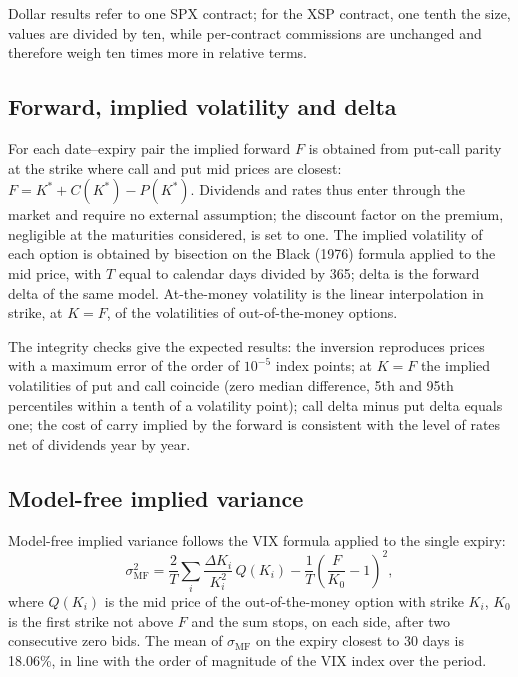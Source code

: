 \documentclass[11pt,a4paper]{article}
\begin{document}
Dollar results refer to one SPX contract; for the XSP contract, one tenth the size, values are divided by ten, while per-contract commissions are unchanged and therefore weigh ten times more in relative terms.

\subsection{Forward, implied volatility and delta}

For each date--expiry pair the implied forward $F$ is obtained from put-call parity at the strike where call and put mid prices are closest: $F = K^\ast + C(K^\ast) - P(K^\ast)$. Dividends and rates thus enter through the market and require no external assumption; the discount factor on the premium, negligible at the maturities considered, is set to one. The implied volatility of each option is obtained by bisection on the Black (1976) formula applied to the mid price, with $T$ equal to calendar days divided by 365; delta is the forward delta of the same model. At-the-money volatility is the linear interpolation in strike, at $K=F$, of the volatilities of out-of-the-money options.

The integrity checks give the expected results: the inversion reproduces prices with a maximum error of the order of $10^{-5}$ index points; at $K=F$ the implied volatilities of put and call coincide (zero median difference, 5th and 95th percentiles within a tenth of a volatility point); call delta minus put delta equals one; the cost of carry implied by the forward is consistent with the level of rates net of dividends year by year.

\subsection{Model-free implied variance}

Model-free implied variance follows the VIX formula applied to the single expiry:
\begin{equation}
\sigma^2_{\mathrm{MF}} = \frac{2}{T}\sum_i \frac{\Delta K_i}{K_i^2}\, Q(K_i) - \frac{1}{T}\left(\frac{F}{K_0}-1\right)^2 ,
\end{equation}
where $Q(K_i)$ is the mid price of the out-of-the-money option with strike $K_i$, $K_0$ is the first strike not above $F$ and the sum stops, on each side, after two consecutive zero bids. The mean of $\sigma_{\mathrm{MF}}$ on the expiry closest to 30 days is 18.06\%, in line with the order of magnitude of the VIX index over the period.
\end{document}
